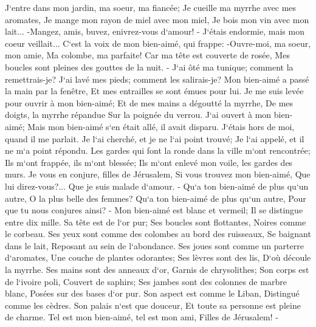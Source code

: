 \verse J`entre dans mon jardin, ma soeur, ma fiancée; Je cueille ma myrrhe avec mes aromates, Je mange mon rayon de miel avec mon miel, Je bois mon vin avec mon lait... -Mangez, amis, buvez, enivrez-vous d`amour! - 
\verse J`étais endormie, mais mon coeur veillait... C`est la voix de mon bien-aimé, qui frappe: -Ouvre-moi, ma soeur, mon amie, Ma colombe, ma parfaite! Car ma tête est couverte de rosée, Mes boucles sont pleines des gouttes de la nuit. - 
\verse J`ai ôté ma tunique; comment la remettrais-je? J`ai lavé mes pieds; comment les salirais-je? 
\verse Mon bien-aimé a passé la main par la fenêtre, Et mes entrailles se sont émues pour lui. 
\verse Je me suis levée pour ouvrir à mon bien-aimé; Et de mes mains a dégoutté la myrrhe, De mes doigts, la myrrhe répandue Sur la poignée du verrou. 
\verse J`ai ouvert à mon bien-aimé; Mais mon bien-aimé s`en était allé, il avait disparu. J`étais hors de moi, quand il me parlait. Je l`ai cherché, et je ne l`ai point trouvé; Je l`ai appelé, et il ne m`a point répondu. 
\verse Les gardes qui font la ronde dans la ville m`ont rencontrée; Ils m`ont frappée, ils m`ont blessée; Ils m`ont enlevé mon voile, les gardes des murs. 
\verse Je vous en conjure, filles de Jérusalem, Si vous trouvez mon bien-aimé, Que lui direz-vous?... Que je suis malade d`amour. - 
\verse Qu`a ton bien-aimé de plus qu`un autre, O la plus belle des femmes? Qu`a ton bien-aimé de plus qu`un autre, Pour que tu nous conjures ainsi? - 
\verse Mon bien-aimé est blanc et vermeil; Il se distingue entre dix mille. 
\verse Sa tête est de l`or pur; Ses boucles sont flottantes, Noires comme le corbeau. 
\verse Ses yeux sont comme des colombes au bord des ruisseaux, Se baignant dans le lait, Reposant au sein de l`abondance. 
\verse Ses joues sont comme un parterre d`aromates, Une couche de plantes odorantes; Ses lèvres sont des lis, D`où découle la myrrhe. 
\verse Ses mains sont des anneaux d`or, Garnis de chrysolithes; Son corps est de l`ivoire poli, Couvert de saphirs; 
\verse Ses jambes sont des colonnes de marbre blanc, Posées sur des bases d`or pur. Son aspect est comme le Liban, Distingué comme les cèdres. 
\verse Son palais n`est que douceur, Et toute sa personne est pleine de charme. Tel est mon bien-aimé, tel est mon ami, Filles de Jérusalem! - 

\chapter{}


